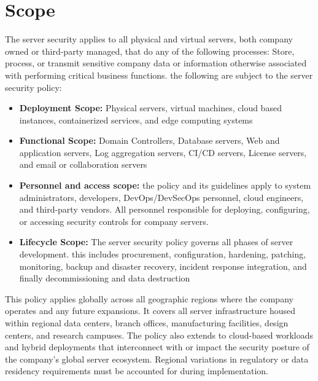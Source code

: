 \section{Scope}
The server security applies to all physical and virtual servers, both company owned or third-party managed, that do any of the following processes: Store, process, or transmit sensitive company data or information otherwise associated with performing critical business functions. the following are subject to the server security policy:
\begin{itemize}
    \item \textbf{Deployment Scope:} Physical servers, virtual machines, cloud based instances, containerized services, and edge computing systems
    \item \textbf{Functional Scope:} Domain Controllers, Database servers, Web and application servers, Log aggregation servers, CI/CD servers, License servers, and email or collaboration servers
    \item \textbf{Personnel and access scope:} the policy and its guidelines apply to system administrators, developers, DevOps/DevSecOps personnel, cloud engineers, and third-party vendors. All personnel responsible for deploying, configuring, or accessing security controls for company servers.
    \item \textbf{Lifecycle Scope:}
    The server security policy governs all phases of server development. this includes procurement, configuration, hardening, patching, monitoring, backup and disaster recovery, incident response integration, and finally decommissioning and data destruction
\end{itemize}
This policy applies globally across all geographic regions where the company operates and any future expansions. It covers all server infrastructure housed within regional data centers, branch offices, manufacturing facilities, design centers, and research campuses. The policy also extends to cloud-based workloads and hybrid deployments that interconnect with or impact the security posture of the company’s global server ecosystem. Regional variations in regulatory or data residency requirements must be accounted for during implementation.
